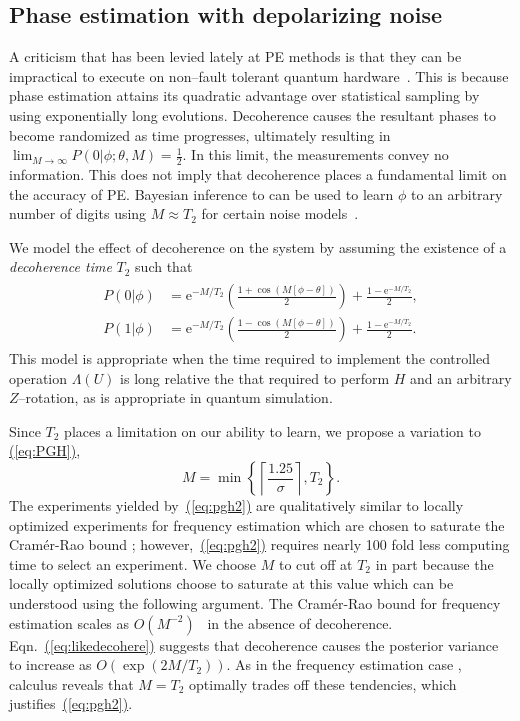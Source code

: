 \documentclass[aps,pra,amsmath,twocolumn,amssymb,superscriptaddress]{revtex4-1}
\newcommand{\eq}[1]{\hyperref[eq:#1]{(\ref*{eq:#1})}}
\newcommand{\ee}{\mathrm{e}}
\begin{document}
\subsection{Phase estimation with depolarizing noise}
A criticism that has been levied lately at PE methods is that they can be impractical to execute on non--fault tolerant quantum hardware~\cite{PMS+14,MBL+14,WHT15}.  This is because phase estimation attains its quadratic advantage over statistical sampling by using exponentially long evolutions.  Decoherence causes the resultant phases to become randomized as time progresses, ultimately resulting in
$\lim_{M\rightarrow \infty} P(0|\phi;\theta,M) = \frac{1}{2}$.
In this limit, the measurements convey no information.  This does not imply that decoherence places a fundamental limit on the accuracy of PE.   Bayesian inference to can be used to learn $\phi$ to an arbitrary number of digits using $M \approx T_2$ for certain noise models~\cite{granade_robust_2012}.  

We model the effect of decoherence on the system by assuming the existence of a \emph{decoherence time} $T_2$ such that
\begin{gather}
    \label{eq:likedecohere}
    \begin{aligned}
        P(0|\phi) & = \ee^{-M/T_2}\left(\frac{1+\cos(M[\phi -\theta])}{2}\right)+\frac{1-\ee^{-M/T_2}}{2},\\
        P(1|\phi) & = \ee^{-M/T_2}\left(\frac{1-\cos(M[\phi -\theta])}{2}\right)+\frac{1-\ee^{-M/T_2}}{2}.
    \end{aligned}
\end{gather}
This model is appropriate when the time required to implement the controlled operation $\Lambda(U)$ is long relative the that required to perform $H$ and an arbitrary $Z$--rotation, as is appropriate in quantum simulation.  %
 

Since $T_2$ places a limitation on our ability to learn, we propose a variation to \eq{PGH},
\begin{equation}
    \label{eq:pgh2}
    M = \min\left\{\left\lceil\frac{1.25}{\sigma}\right\rceil, T_2 \right\}.
\end{equation}
The experiments yielded by~\eq{pgh2} are qualitatively similar to locally optimized experiments for frequency estimation which are chosen to saturate the Cram\'er-Rao bound \cite{ferrie_how_2013}; however,~\eq{pgh2} requires nearly 100 fold less computing time to select an experiment.
We choose $M$ to cut off at $T_2$ in part because the locally optimized solutions choose to saturate at this value which can be understood using the following argument.  The Cram\'er-Rao bound for frequency estimation scales as $O(M^{-2})$~\cite{WGC15} in the absence of decoherence.  Eqn.~\eq{likedecohere} suggests that decoherence causes the posterior variance to increase as $O(\exp(2M/T_2))$. { As in the frequency estimation case \cite{ferrie_how_2013},} calculus reveals that $M=T_2$ optimally trades off these tendencies, which justifies~\eq{pgh2}.
\end{document}
